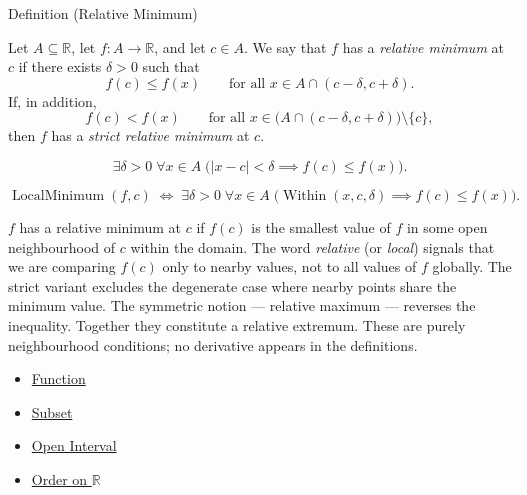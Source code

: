 
\begin{definitionbox}{Definition (Relative Minimum)}
\begin{definition}
\label{def:relative-minimum}
Let $A \subseteq \mathbb{R}$, let $f : A \to \mathbb{R}$, and let $c \in A$. We say that $f$ has a \emph{relative minimum} at $c$ if there exists $\delta > 0$ such that
\[
f(c) \leq f(x) \qquad \text{for all } x \in A \cap (c-\delta,c+\delta).
\]
If, in addition,
\[
f(c) < f(x) \qquad \text{for all } x \in \bigl(A \cap (c-\delta,c+\delta)\bigr)\setminus\{c\},
\]
then $f$ has a \emph{strict relative minimum} at $c$.
\end{definition}
\end{definitionbox}

\begin{remark*}
\[
\exists \delta > 0\;\forall x \in A\;
\bigl(|x - c| < \delta \implies f(c) \leq f(x)\bigr).
\]
\end{remark*}

\begin{remark*}
\[
\operatorname{LocalMinimum}(f, c)
\;\Longleftrightarrow\;
\exists \delta > 0\;\forall x \in A\;
\bigl(\operatorname{Within}(x, c, \delta) \implies f(c) \leq f(x)\bigr).
\]
\end{remark*}

\begin{remark*}[Interpretation]
$f$ has a relative minimum at $c$ if $f(c)$ is the smallest value of $f$ in some open neighbourhood of $c$ within the domain. The word \emph{relative} (or \emph{local}) signals that we are comparing $f(c)$ only to nearby values, not to all values of $f$ globally. The strict variant excludes the degenerate case where nearby points share the minimum value. The symmetric notion --- relative maximum --- reverses the inequality. Together they constitute a relative extremum. These are purely neighbourhood conditions; no derivative appears in the definitions.
\end{remark*}

\begin{dependencies}
\begin{itemize}
  \item \hyperref[def:function]{Function}
  \item \hyperref[def:subset]{Subset}
  \item \hyperref[def:open-interval]{Open Interval}
  \item \hyperref[def:order-on-r]{Order on $\mathbb{R}$}
\end{itemize}
\end{dependencies}

